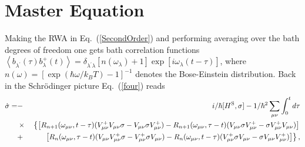\documentclass[12pt,twoside,a4paper]{report}
\begin{document}
\section{Master Equation} \label{sect-MastEq}
Making the RWA in Eq.~(\ref{SecondOrder})
and performing averaging over the bath degrees of freedom
one gets bath correlation functions \cite{blum96,redf55}
$\left< 
   b_{\lambda^\prime}(\tau)
   b^+_\lambda(t) 
 \right> 
        =    \delta_{\lambda^\prime \lambda}
             \left[
                 n(\omega_{\lambda})+1
             \right] 
             \exp{
                 \left[
                     i\omega_{\lambda}(t-\tau)
                 \right]}$,
where $n(\omega)=[\exp{(\hbar\omega/k_B T)}-1]^{-1}$ 
denotes the Bose-Einstein distribution.
Back in the Schr\"odinger picture Eq.~(\ref{four})
reads
\begin{eqnarray}
  \dot 
  \sigma 
          =
             &-& 
                 i/\hbar[H^{\rm S},\sigma]   
                    -1/\hbar^2\sum_{\mu{}\nu} 
                      \int_0^t d\tau 
                       \label{Louisell} \\
                  &\times{}& \left\{ 
                    \left[
            R_{n+1}(\omega_{\mu \nu},t-\tau)
                     ( V_{\mu{}\nu}^+ V_{\mu{}\nu} \sigma  
                   - V_{\mu{}\nu} \sigma V_{\mu{}\nu}^+ ) 
          - R_{n+1}(\omega_{\mu \nu},\tau-t) 
                     ( V_{\mu{}\nu} \sigma V_{\mu{}\nu}^+  
                     - \sigma V_{\mu{}\nu}^+ V_{\mu{}\nu} )  
                     \right]
                     \right.  
                     \nonumber \\ 
                   &+& 
                     \left.
                     \left[
            R_n(\omega_{\mu \nu},\tau-t) 
                     (V_{\mu{}\nu} V_{\mu{}\nu}^+ \sigma 
                    - V_{\mu{}\nu}^+ \sigma V_{\mu{}\nu} )
          - R_n(\omega_{\mu \nu},t-\tau) 
                     (V_{\mu{}\nu}^+ \sigma V_{\mu{}\nu} 
                    - \sigma V_{\mu{}\nu} V_{\mu{}\nu}^+ ) 
                     \right]
                     \right\}, \nonumber
\end{eqnarray}
\end{document}
